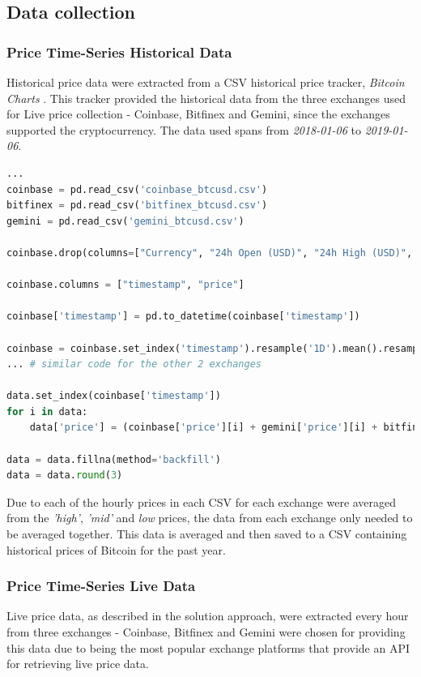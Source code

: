 \documentclass[oneside, 12pt]{article}
\begin{document}
		\subsection{Data collection}\label{collection}
			\subsubsection{Price Time-Series Historical Data}
			Historical price data were extracted from a CSV historical price tracker, \textit{Bitcoin Charts} \cite{35}. This tracker provided the historical data from the three exchanges used for Live price collection - Coinbase, Bitfinex and Gemini, since the exchanges supported the cryptocurrency. The data used spans from \textit{2018-01-06} to \textit{2019-01-06}.
			
			\begin{lstlisting}[language=Python, caption=Historical price collection and averaging per exchange]
...
coinbase = pd.read_csv('coinbase_btcusd.csv')
bitfinex = pd.read_csv('bitfinex_btcusd.csv')
gemini = pd.read_csv('gemini_btcusd.csv')
			
coinbase.drop(columns=["Currency", "24h Open (USD)", "24h High (USD)", "24h Low (USD)"], axis=1, inplace=True)
			
coinbase.columns = ["timestamp", "price"]
			
coinbase['timestamp'] = pd.to_datetime(coinbase['timestamp'])
			
coinbase = coinbase.set_index('timestamp').resample('1D').mean().resample('1H').mean()
... # similar code for the other 2 exchanges
			
data.set_index(coinbase['timestamp'])
for i in data:
	data['price'] = (coinbase['price'][i] + gemini['price'][i] + bitfinex['price'][i])/3
			
data = data.fillna(method='backfill')
data = data.round(3)
			\end{lstlisting}
			
			Due to each of the hourly prices in each CSV for each exchange were averaged from the \textit{'high'}, \textit{'mid'} and \textit{low} prices, the data from each exchange only needed to be averaged together. This data is averaged and then saved to a CSV containing historical prices of Bitcoin for the past year.
			
			\subsubsection{Price Time-Series Live Data}
			Live price data, as described in the solution approach, were extracted every hour from three exchanges - Coinbase, Bitfinex and Gemini were chosen for providing this data due to being the most popular exchange platforms that provide an API for retrieving live price data.
			
\end{document}
